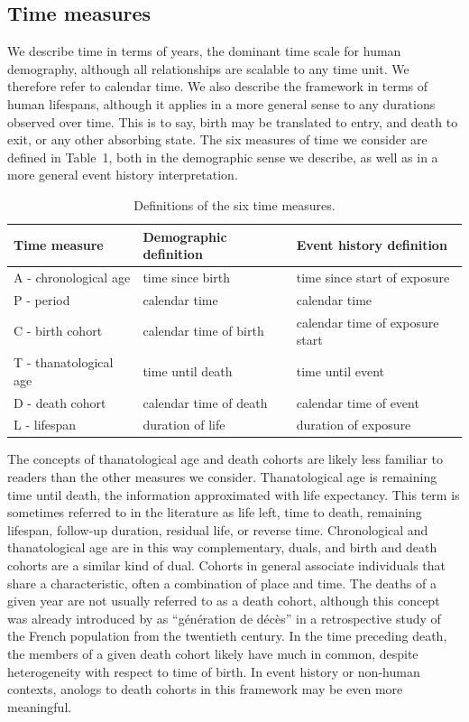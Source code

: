 \documentclass{bmcart}
\theoremstyle{definition}
\begin{document}
\FloatBarrier
\subsection{Time measures}
\FloatBarrier
We describe time in terms of years, the dominant time scale for human
demography, although all relationships are scalable to any time unit. We
therefore refer to calendar time. We also describe the framework in terms of
human lifespans, although it applies in a more general sense to any durations observed over time. This is to say, birth may be translated to entry, and death
to exit, or any other absorbing state. The six measures of time we consider are
defined in Table~1, both in the demographic sense we describe, as well as in a more general event history interpretation.

\FloatBarrier
\begin{table}[ht!]
\centering
\caption{Definitions of the six time measures.}
\label{tab:sixdefs}
\begin{adjustwidth}{0em}{0em}
\begin{tabular}{lll}
\hline 
\textbf{Time measure}	& \textbf{Demographic definition}	& \textbf{Event history definition}	\\ \hline 
A - chronological age 	& time since birth 			& time since start of exposure 		\\
P - period 		        & calendar time 			& calendar time				\\
C - birth cohort 	    & calendar time of birth 	& calendar time of exposure
start
\\
T - thanatological age 	& time until death 			& time until event			\\
D - death cohort	    & calendar time of death	& calendar time of event		\\
L - lifespan		    & duration of life			& duration of exposure			\\ \hline
\end{tabular}
\end{adjustwidth}
\end{table}

The concepts of thanatological age and death cohorts are likely less familiar to
readers than the other measures we consider. Thanatological age is
remaining time until death, the information approximated with life
expectancy. This term is sometimes referred to in the literature as life left,
time to death, remaining lifespan, follow-up duration, residual life, or
reverse time. Chronological and thanatological age are in this way
complementary, duals, and birth and death cohorts are a similar kind of dual.
Cohorts in general associate individuals that share a characteristic, often a combination of place and time. The deaths of a given year are not usually referred to as a death
cohort, although this concept was already introduced by \cite{brouard1986} as
``g\'en\'eration de d\'ec\`es'' in a retrospective study of the French
population from the twentieth century. In the time preceding death, the members of a given death cohort likely have much in common, despite heterogeneity with respect to time of birth. In event history or non-human contexts, anologs to death cohorts in this framework may be even more meaningful.
\end{document}
